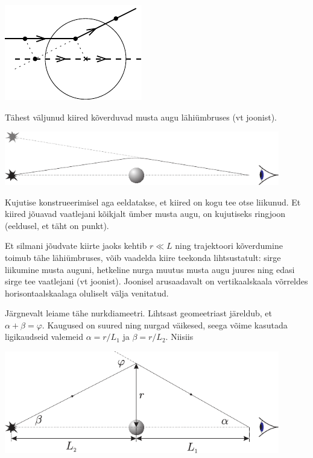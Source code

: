 \documentclass[10pt, twoside]{article}
\begin{document}
{\begin{center}
	\includegraphics[width=0.5\linewidth]{2011-v2g-10-lah}
\end{center}
\probend
\bigskip


\solu
Tähest väljunud kiired kõverduvad musta augu lähiümbruses (vt joonist). 

\begin{center}
	\includegraphics[width=0.9\textwidth]{2007-v2g-10-lah1}
\end{center}

Kujutise konstrueerimisel aga eeldatakse, et kiired on kogu tee otse liikunud. Et kiired jõuavad vaatlejani kõikjalt ümber musta augu, on kujutiseks ringjoon (eeldusel, et täht on punkt).

Et silmani jõudvate kiirte jaoks kehtib $r \ll L$ ning trajektoori kõverdumine toimub tähe lähiümbruses, võib vaadelda kiire teekonda lihtsustatult: sirge liikumine musta auguni, hetkeline nurga muutus musta augu juures ning edasi sirge tee vaatlejani (vt joonist). Joonisel arusaadavalt on vertikaalskaala võrreldes horisontaalskaalaga oluliselt välja venitatud.

Järgnevalt leiame tähe nurkdiameetri. Lihtsast geomeetriast järeldub, et $\alpha + \beta = \varphi$. Kaugused on suured ning nurgad väikesed, seega võime kasutada ligikaudseid valemeid $\alpha = r/L_1$ ja $\beta = r/L_2$. Niisiis

\begin{center}
	\includegraphics[width=0.9\textwidth]{2007-v2g-10-lah2}
\end{center}

}
\end{document}
